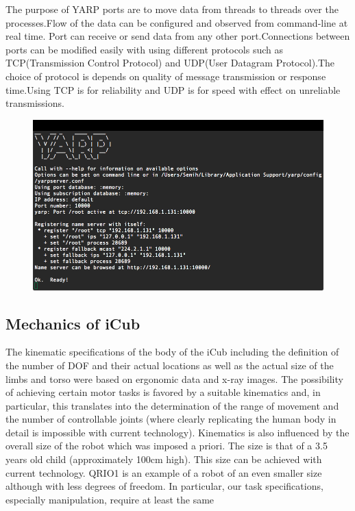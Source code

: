 \documentclass[a4paper, 11pt]{report}
\begin{document}
The purpose of YARP ports are to move data from threads to threads over the 
processes.Flow of the data can be configured and observed from command-line 
at 
real time. Port can receive or send data from any other port.Connections 
between ports can be modified easily with using different protocols such as 
TCP(Transmission Control Protocol) and UDP(User Datagram Protocol).The choice 
of protocol is depends on quality of message transmission or response 
time.Using TCP is for reliability and UDP is for speed with effect on 
unreliable transmissions.
  \begin{figure}[h!]
    \centering
    \includegraphics[width=0.8\linewidth]{yarp}
    \caption{}
    \label{fig:yarp}
  \end{figure}
  \newpage
  \subsection{Mechanics of iCub}
  
The kinematic specifications of the body of the iCub including the definition 
of the number of DOF and their actual locations as well as the actual size of 
the limbs and torso were based on ergonomic data and x-ray images.
The possibility of achieving certain motor tasks is favored by a suitable 
kinematics and, in particular, this translates into the determination of the 
range of movement and the number of controllable joints (where clearly 
replicating the human body in detail is impossible with current technology). 
Kinematics is also influenced by the overall size of the robot which was 
imposed a priori. The size is that of a 3.5 years old child (approximately 
100cm high). This size can be achieved with current technology. QRIO1 is an 
example of a robot of an even smaller size although with less degrees of 
freedom. In particular, our task specifications, especially manipulation, 
require at least the same  
\end{document}
